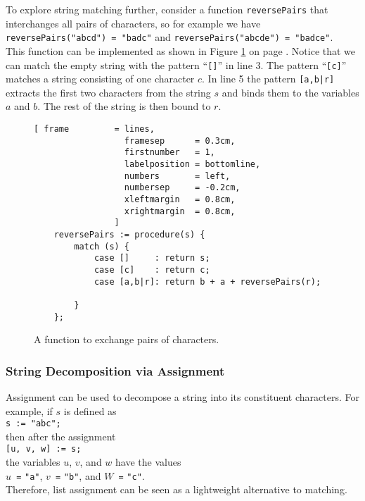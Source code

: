 To explore string matching further, consider a function \texttt{reversePairs} that interchanges all pairs
of characters, so for example we have
\\[0.2cm]
\hspace*{1.3cm}
\texttt{reversePairs("abcd") = "badc"} \quad and \quad
\texttt{reversePairs("abcde") = "badce"}. 
\\[0.2cm]
This function can be implemented as shown in Figure \ref{fig:reverse-pairs.stlx} on page
\pageref{fig:reverse-pairs.stlx}.  Notice that we can match the empty string with the pattern
``\texttt{[]}'' in line 3.  The pattern ``\texttt{[c]}'' matches a string consisting of one
character $c$.  In line 5 the pattern \texttt{[a,b|r]} extracts the first two
characters from the string $s$ and binds them to the variables $a$ and $b$.  The rest of the string is
then bound to $r$.

\begin{figure}[!ht]
\centering
\begin{Verbatim}[ frame         = lines, 
                  framesep      = 0.3cm, 
                  firstnumber   = 1,
                  labelposition = bottomline,
                  numbers       = left,
                  numbersep     = -0.2cm,
                  xleftmargin   = 0.8cm,
                  xrightmargin  = 0.8cm,
                ]
    reversePairs := procedure(s) {
        match (s) {
            case []     : return s;
            case [c]    : return c;
            case [a,b|r]: return b + a + reversePairs(r);
    
        }
    };
\end{Verbatim}
\vspace*{-0.3cm}
\caption{A function to exchange pairs of characters.}
\label{fig:reverse-pairs.stlx}
\end{figure}

\subsubsection{String Decomposition via Assignment}
Assignment can be used to decompose a string into its constituent characters.  For
example, if $s$ is defined as
\\[0.2cm]
\hspace*{1.3cm}
\texttt{s := }\verb|"abc";|
\\[0.2cm]
then after the assignment
\\[0.2cm]
\hspace*{1.3cm}
\texttt{[u, v, w] := s;}
\\[0.2cm]
the variables $u$, $v$, and $w$ have the values
\\[0.2cm]
\hspace*{1.3cm}
\texttt{$u$ =} \verb|"a"|,
\texttt{$v$ =} \verb|"b"|, \quad and
\texttt{$W$ =} \verb|"c"|. 
\\[0.2cm]
Therefore, list assignment can be seen as a lightweight alternative to matching.

